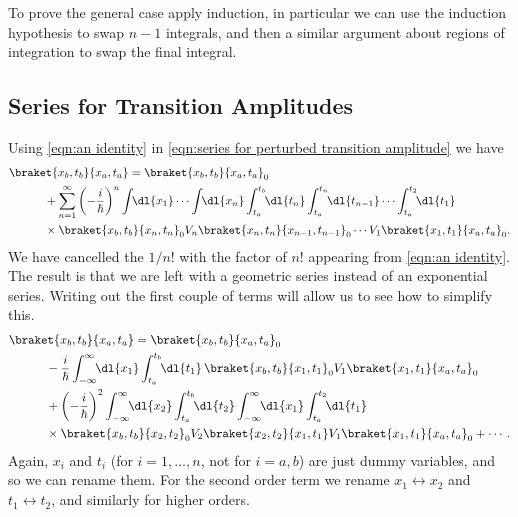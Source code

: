 \documentclass[fleqn]{NotesClass}
\begin{document}
    To prove the general case apply induction, in particular we can use the induction hypothesis to swap \(n - 1\) integrals, and then a similar argument about regions of integration to swap the final integral.
    
    \subsection{Series for Transition Amplitudes}
    Using \cref{eqn:an identity} in \cref{eqn:series for perturbed transition amplitude} we have
    \begin{align}\label{eqn:transition amplitude scattering series}
        &\braket{x_b, t_b}{x_a, t_a} = \braket{x_b, t_b}{x_a, t_a}_0 \notag\\
        &\quad\qquad {} + \sum_{n=1}^{\infty} \left( -\frac{i}{\hbar} \right)^n \int \!\! \dl{x_1} \dotsm \int \!\! \dl{x_n} \int_{t_a}^{t_b} \!\! \dl{t_n} \int_{t_a}^{t_n} \!\! \dl{t_{n-1}} \dotsm \int_{t_a}^{t_2} \!\! \dl{t_1} \notag\\
        &\quad\qquad \times \braket{x_b, t_b}{x_n, t_n}_0 V_n \braket{x_n, t_n}{x_{n-1}, t_{n-1}}_0 \dotsm V_1 \braket{x_1, t_1}{x_a, t_a}_0.
    \end{align}
    We have cancelled the \(1/n!\) with the factor of \(n!\) appearing from \cref{eqn:an identity}.
    The result is that we are left with a geometric series instead of an exponential series.
    Writing out the first couple of terms will allow us to see how to simplify this.
    \begin{align}
        &\braket{x_b, t_b}{x_a, t_a} = \braket{x_b, t_b}{x_a, t_a}_0\notag\\
        &\quad\qquad {} - \frac{i}{\hbar} \int_{-\infty}^{\infty} \!\! \dl{x_1} \int_{t_a}^{t_b} \!\! \dl{t_1} \, \braket{x_b, t_b}{x_1, t_1}_0 V_1 \braket{x_1, t_1}{x_a, t_a}_0\notag\\
        &\quad\qquad {} + \left( -\frac{i}{\hbar} \right)^2 \int_{-\infty}^{\infty} \!\! \dl{x_2} \int_{t_a}^{t_b} \!\! \dl{t_2} \int_{-\infty}^{\infty} \!\! \dl{x_1} \int_{t_a}^{t_2} \!\! \dl{t_1}\notag\\
        &\quad\qquad \times \braket{x_b, t_b}{x_2, t_2}_0 V_2 \braket{x_2, t_2}{x_1, t_1} V_1 \braket{x_1, t_1}{x_a, t_a}_0 + \dotsb.
    \end{align}
    Again, \(x_i\) and \(t_i\) (for \(i = 1, \dotsc, n\), not for \(i = a, b\)) are just dummy variables, and so we can rename them.
    For the second order term we rename \(x_1 \leftrightarrow x_2\) and \(t_1 \leftrightarrow t_2\), and similarly for higher orders.
\end{document}
